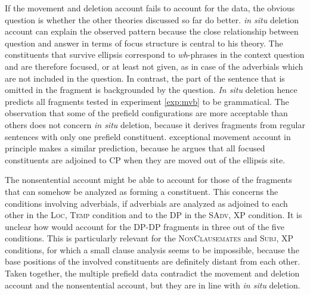 If the movement and deletion account fails to account for the data, the obvious question is whether the other theories discussed so far do better.  \textit{in situ} deletion account can explain the observed pattern because the close relationship between question and answer in terms of focus structure is central to his theory. The constituents that survive ellipsis correspond to \textit{wh}-phrases in the context question and are therefore focused, or at least not given, as in case of the adverbials which are not included in the question. In contrast, the part of the sentence that is omitted in the fragment is backgrounded by the question. \textit{In situ} deletion hence predicts all fragments tested in experiment \ref{exp:mvb} to be grammatical. The observation that some of the prefield configurations are more acceptable than others does not concern \textit{in situ} deletion, because it derives fragments from regular sentences with only one prefield constituent.  exceptional movement account in principle makes a similar prediction, because he argues that all focused constituents are adjoined to CP when they are moved out of the ellipsis site.

\noindent The nonsentential account might be able to account for those of the fragments that can somehow be analyzed as forming a constituent. This concerns the conditions involving adverbials, if adverbials are analyzed as adjoined to each other in the \textsc{Loc, Temp} condition and to the DP in the \textsc{SAdv, XP} condition. It is unclear how \citet{barton.progovac2005} would account for the DP-DP fragments in three out of the five conditions. This is particularly relevant for the \textsc{NonClausemates} and \textsc{Subj, XP} conditions, for which a small clause analysis seems to be impossible, because the base positions of the involved constituents are definitely distant from each other. Taken together, the multiple prefield data contradict the movement and deletion account and the nonsentential account, but they are in line with \textit{in situ} deletion.

